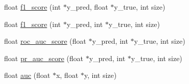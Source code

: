 \begin{DoxyCompactItemize}
\item 
float \hyperlink{namespace_metrics_a708722c37e939f76a4753c04808421ac}{f1\+\_\+score} (int $\ast$y\+\_\+pred, float $\ast$y\+\_\+true, int size)
\item 
float \hyperlink{namespace_metrics_a48799d96327e74019f2afd1a584483a5}{f1\+\_\+score} (int $\ast$y\+\_\+pred, int $\ast$y\+\_\+true, int size)
\item 
float \hyperlink{namespace_metrics_a1492644b42d26c2cc1af789df8bd588f}{roc\+\_\+auc\+\_\+score} (float $\ast$y\+\_\+pred, int $\ast$y\+\_\+true, int size)
\item 
float \hyperlink{namespace_metrics_a2f6773b04903e1115c8ee7db0b97862c}{pr\+\_\+auc\+\_\+score} (float $\ast$y\+\_\+pred, int $\ast$y\+\_\+true, int size)
\item 
float \hyperlink{namespace_metrics_ab0cb806dfe2f0e87809e776d5ff5027c}{auc} (float $\ast$x, float $\ast$y, int size)
\end{DoxyCompactItemize}


